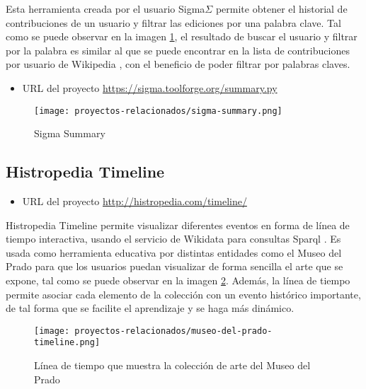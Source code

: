 Esta herramienta creada por el usuario Sigma\(\Sigma\) permite obtener el historial de contribuciones de un usuario y filtrar las ediciones por una palabra clave. Tal como se puede observar en la imagen \ref{fig:sigma_summary}, el resultado de buscar el usuario  y filtrar por la palabra  es similar al que se puede encontrar en la lista de contribuciones por usuario de Wikipedia \cite{UserClarityfiend}, con el beneficio de poder filtrar por palabras claves.

\begin{itemize}
    \item URL del proyecto \url{https://sigma.toolforge.org/summary.py}
\end{itemize}

\begin{figure}[H]
    \centering
    \texttt{[image: proyectos-relacionados/sigma-summary.png]}
    \caption{Sigma Summary}
    \label{fig:sigma_summary}
\end{figure}

\subsection{Histropedia Timeline}

\begin{itemize}
    \item URL del proyecto \url{http://histropedia.com/timeline/}
\end{itemize}

Histropedia Timeline permite visualizar diferentes eventos en forma de línea de tiempo interactiva, usando el servicio de Wikidata para consultas Sparql \cite{WikidataSparql}. Es usada como herramienta educativa por distintas entidades como el Museo del Prado para que los usuarios puedan visualizar de forma sencilla el arte que se expone, tal como se puede observar en la imagen \ref{fig:museo-de-prado-timeline}. Además, la línea de tiempo permite asociar cada elemento de la colección con un evento histórico importante, de tal forma que se facilite el aprendizaje y se haga más dinámico.

\begin{figure}[H]
    \centering
    \texttt{[image: proyectos-relacionados/museo-del-prado-timeline.png]}
    \caption{Línea de tiempo que muestra la colección de arte del Museo del Prado}
    \label{fig:museo-de-prado-timeline}
\end{figure}



